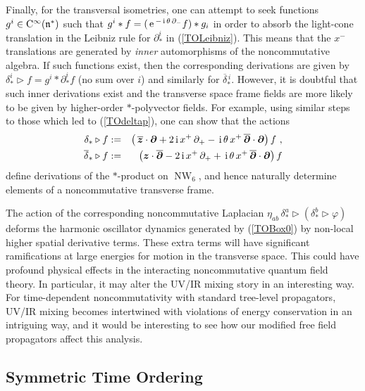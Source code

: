 \documentclass[11pt,a4paper]{article}
\DeclareMathOperator{\NW}{NW}
\def\nn{\nonumber}
\newcommand{\1}{\mathbb{1}}
\newcommand{\mbf}[1]{{\boldsymbol {#1} }}
\def\ii{{\,{\rm i}\,}}
\def\CC{{\rm C}}
\def\mz{{\mbf z}}
\def\mdell{{\mbf\partial}}
\def\mfn{{\mathfrak n}}
\def\nn{\nonumber}
\def\e{{\,\rm e}\,}
\begin{document}
Finally, for the transversal isometries, one can attempt to seek
functions $g^i\in\CC^\infty(\mfn^*)$ such that
$g^i*f=(\e^{-\ii\theta\,\partial_-}f)*g_i$ in order to absorb
the light-cone translation in the Leibniz rule for $\partial_*^i$ in
(\ref{TOLeibniz}). This means that the $x^-$ translations are
generated by {\it inner} automorphisms of the noncommutative
algebra. If such functions exist, then the corresponding derivations
are given by $\delta^i_*\triangleright f=g^i*\partial_*^if$ (no sum over
$i$) and similarly for $\overline{\delta}{}^{\,i}_*$. However, it is
doubtful that such inner derivations exist and the transverse space
frame fields are more likely to be given by higher-order $*$-polyvector
fields. For example, using similar steps to those which led to
(\ref{TOdeltap}), one can show that the actions
\begin{eqnarray}
\delta_*\triangleright f&:=&\left(\,\overline{\mz}\cdot\mdell+2\ii
x^+\,\partial_+-\ii\theta\,x^+\,\overline{\mdell}\cdot\mdell\right)f
\ , \nn\\
\overline{\delta}{}_*\triangleright f&:=&\left({\mz}\cdot
\overline{\mdell}-2\ii
x^+\,\partial_++\ii\theta\,x^+\,\overline{\mdell}\cdot\mdell\right)f
\label{TOdeltatransv}\end{eqnarray}
define derivations of the $*$-product on $\NW_6$, and hence naturally
determine elements of a noncommutative transverse frame.

The action of the corresponding noncommutative Laplacian
$\eta_{ab}\,\delta_*^a\triangleright(\delta_*^b\triangleright\varphi)$
deforms the harmonic oscillator dynamics generated by (\ref{TOBox0})
by non-local higher spatial derivative terms. These extra terms will
have significant ramifications at large energies for motion in the
transverse space. This could have profound physical effects in the
interacting noncommutative quantum field theory. In particular, it may
alter the UV/IR mixing story in an interesting way. For time-dependent
noncommutativity with standard tree-level propagators, UV/IR mixing
becomes intertwined with violations of energy conservation in an
intriguing way, and it would be interesting to see how our modified
free field propagators affect this analysis.

\subsection{Symmetric Time Ordering\label{ScalarSTO}}
\end{document}
